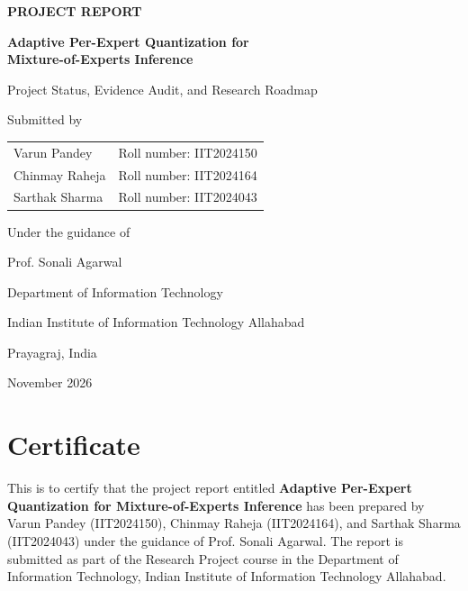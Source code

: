 \documentclass[12pt,a4paper]{report}
\begin{document}
\begin{titlepage}
\thispagestyle{empty}
\centering
\vspace*{0.35in}
{\Large\bfseries PROJECT REPORT\par}
\vspace{0.55in}
{\LARGE\bfseries Adaptive Per-Expert Quantization for\\[0.15em]
Mixture-of-Experts Inference\par}
\vspace{0.4in}
{\large Project Status, Evidence Audit, and Research Roadmap\par}
\vspace{0.55in}
Submitted by\par
\vspace{0.15in}
\begin{tabular}{ll}
Varun Pandey & Roll number: IIT2024150\\
Chinmay Raheja & Roll number: IIT2024164\\
Sarthak Sharma & Roll number: IIT2024043
\end{tabular}
\vspace{0.45in}

Under the guidance of\par
Prof. Sonali Agarwal\par
\vspace{0.4in}
Department of Information Technology\par
Indian Institute of Information Technology Allahabad\par
Prayagraj, India\par
\vfill
November 2026
\end{titlepage}


\chapter*{Certificate}
This is to certify that the project report entitled \textbf{Adaptive Per-Expert Quantization for Mixture-of-Experts Inference} has been prepared by Varun Pandey (IIT2024150), Chinmay Raheja (IIT2024164), and Sarthak Sharma (IIT2024043) under the guidance of Prof. Sonali Agarwal. The report is submitted as part of the Research Project course in the Department of Information Technology, Indian Institute of Information Technology Allahabad.
\end{document}
